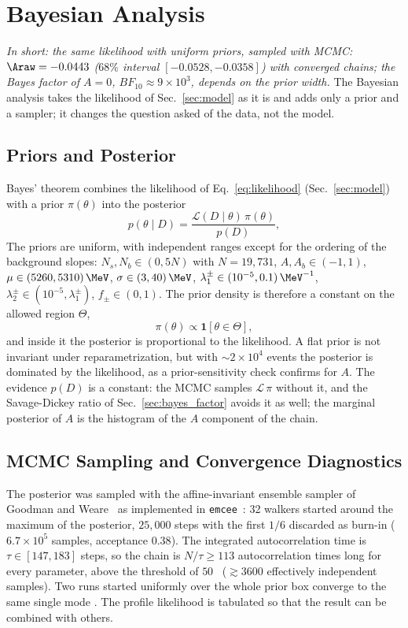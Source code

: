 \section{Bayesian Analysis}
\label{sec:bayesian}
\emph{In short: the same likelihood with uniform priors, sampled with MCMC: $\Araw=-0.0443$ ($68\%$ interval $[-0.0528,-0.0358]$) with converged chains; the Bayes factor of $A=0$, $BF_{10}\approx9\times10^3$, depends on the prior width.}
The Bayesian analysis takes the likelihood of Sec.~\ref{sec:model} as it is and adds only a prior and a sampler; it changes the question asked of the data, not the model.
\subsection{Priors and Posterior}
\label{sec:bayes_prior}
Bayes' theorem combines the likelihood of Eq.~\eqref{eq:likelihood} (Sec.~\ref{sec:model}) with a prior $\pi(\theta)$ into the posterior
\begin{equation}
p(\theta\mid D)=\frac{\mathcal{L}(D\mid\theta)\,\pi(\theta)}{p(D)},
\label{eq:bayes}
\end{equation}
The priors are uniform, with independent ranges except for the ordering of the background slopes: $N_s,N_b\in(0,5N)$ with $N=19{,}731$, $A,A_b\in(-1,1)$, $\mu\in(5260,5310)\,\MeV$, $\sigma\in(3,40)\,\MeV$, $\lambda_1^{\pm}\in(10^{-5},0.1)\,\MeV^{-1}$, $\lambda_2^{\pm}\in(10^{-5},\lambda_1^{\pm})$, $f_{\pm}\in(0,1)$. The prior density is therefore a constant on the allowed region $\Theta$,
\begin{equation}
\pi(\theta)\propto\mathbf{1}\left[\theta\in\Theta\right],
\label{eq:prior}
\end{equation}
and inside it the posterior is proportional to the likelihood. A flat prior is not invariant under reparametrization, but with $\sim$$2\times10^4$ events the posterior is dominated by the likelihood, as a prior-sensitivity check confirms for $A$. The evidence $p(D)$ is a constant: the MCMC samples $\mathcal{L}\,\pi$ without it, and the Savage-Dickey ratio of Sec.~\ref{sec:bayes_factor} avoids it as well; the marginal posterior of $A$ is the histogram of the $A$ component of the chain.
\subsection{MCMC Sampling and Convergence Diagnostics}
\label{sec:bayes_mcmc}
The posterior was sampled with the affine-invariant ensemble sampler of Goodman and Weare~\cite{goodman_weare} as implemented in \texttt{emcee}~\cite{emcee}: 32 walkers started around the maximum of the posterior, $25{,}000$ steps with the first $1/6$ discarded as burn-in ($6.7\times10^5$ samples, acceptance $0.38$). The integrated autocorrelation time is $\tau\in[147,183]$ steps, so the chain is $N/\tau\geq113$ autocorrelation times long for every parameter, above the threshold of $50$~\cite{emcee} ($\gtrsim3600$ effectively independent samples). Two runs started uniformly over the whole prior box converge to the same single mode . The profile likelihood is tabulated so that the result can be combined with others.
